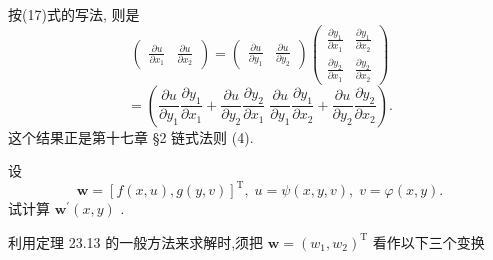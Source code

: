 按(17)式的写法, 则是
\[
\left( \begin{array}{ll} \frac{\partial u}{\partial {x}_{1}} & \frac{\partial u}{\partial {x}_{2}} \end{array}\right)  = \left( \begin{array}{ll} \frac{\partial u}{\partial {y}_{1}} & \frac{\partial u}{\partial {y}_{2}} \end{array}\right) \left( \begin{array}{ll} \frac{\partial {y}_{1}}{\partial {x}_{1}} & \frac{\partial {y}_{1}}{\partial {x}_{2}} \\  \frac{\partial {y}_{2}}{\partial {x}_{1}} & \frac{\partial {y}_{2}}{\partial {x}_{2}} \end{array}\right)
\]
\[
= \left( {\frac{\partial u}{\partial {y}_{1}}\frac{\partial {y}_{1}}{\partial {x}_{1}} + \frac{\partial u}{\partial {y}_{2}}\frac{\partial {y}_{2}}{\partial {x}_{1}}\;\frac{\partial u}{\partial {y}_{1}}\frac{\partial {y}_{1}}{\partial {x}_{2}} + \frac{\partial u}{\partial {y}_{2}}\frac{\partial {y}_{2}}{\partial {x}_{2}}}\right) .
\]
这个结果正是第十七章 §2 链式法则 (4).

\begin{example}

\end{example}
设
\[
\mathbf{w} = {\left\lbrack  f\left( x,u\right) ,g\left( y,v\right) \right\rbrack  }^{\mathrm{T}},\;u = \psi \left( {x,y,v}\right) ,\;v = \varphi \left( {x,y}\right) .
\]
试计算 \({\mathbf{w}}^{\prime }\left( {x,y}\right)\) .

\begin{solution}

\end{solution}
利用定理 23.13 的一般方法来求解时,须把 \(\mathbf{w} = {\left( {w}_{1},{w}_{2}\right) }^{\mathrm{T}}\) 看作以下三个变换

